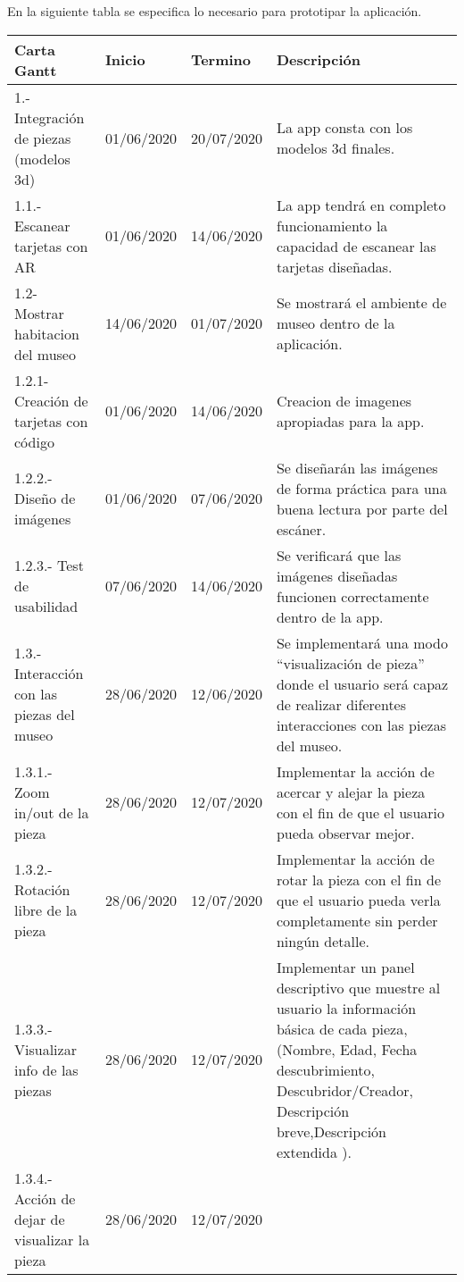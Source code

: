 En la siguiente tabla se especifica lo necesario para prototipar la aplicación.

\begin{longtable}{| p{}| p{}| p{}| p{}|}
\hline 
	Carta Gantt & 
	Inicio & 
	Termino	& 
	Descripción
\\ 
\hline 
	1.- Integración de piezas (modelos 3d) &
	01/06/2020 &
	20/07/2020 & 
	La app consta con los modelos 3d finales.
\\ 
\hline 
	1.1.- Escanear tarjetas con AR &
 	01/06/2020 & 
 	14/06/2020 & 
	La app tendrá en completo funcionamiento la capacidad de escanear las tarjetas diseñadas.
\\ 
\hline 
	1.2-  Mostrar habitacion del museo &
	14/06/2020 &
	01/07/2020 & 
	Se mostrará el ambiente de museo dentro de la aplicación.
	\\ 
\hline 
	1.2.1- Creación de tarjetas con código &
	01/06/2020 &
	14/06/2020 & 
	Creacion de imagenes apropiadas para la app.
	\\
\hline 
	1.2.2.- Diseño de imágenes &
	01/06/2020 &
	07/06/2020 &
	Se diseñarán las imágenes de forma práctica para una buena lectura por parte del escáner.
\\
\hline 
	1.2.3.- Test de usabilidad &
	07/06/2020 &
	14/06/2020 & 
	Se verificará que las imágenes diseñadas funcionen correctamente dentro de la app.
\\ 
\hline 
	1.3.- Interacción con las piezas del museo &
	28/06/2020 &
	12/06/2020 & 
	Se implementará una modo “visualización de pieza” donde el usuario será capaz de realizar diferentes interacciones con las piezas del museo.
\\
\hline 
	1.3.1.- Zoom in/out de la pieza &
	28/06/2020 &
	12/07/2020 & 
	Implementar la acción de acercar y alejar la pieza con el fin de que el usuario pueda observar mejor.
\\
\hline 
	1.3.2.- Rotación libre de la pieza &
	28/06/2020 &
	12/07/2020 & 
	Implementar la acción de rotar la pieza con el fin de que el usuario pueda verla completamente sin perder ningún detalle.
	\\
\hline 
	1.3.3.- Visualizar info de las piezas &
	28/06/2020 &
	12/07/2020 &
	Implementar un panel descriptivo que muestre al usuario la información básica de cada pieza, (Nombre, Edad, Fecha descubrimiento, Descubridor/Creador, Descripción breve,Descripción extendida ).
\\
\hline 
	1.3.4.- Acción de dejar de visualizar la pieza &
	28/06/2020 &
	12/07/2020 &

\end{longtable}
